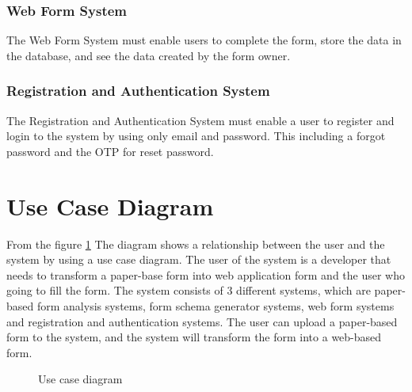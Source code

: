\documentclass[12pt,oneside,openright,a4paper]{cpe-english-project}
\begin{document}
\subsubsection{Web Form System}

The Web Form System must enable users to complete the form, store the data in the database, and see the data created by the form owner.

\subsubsection{Registration and Authentication System}

The Registration and Authentication System must enable a user to register and login to the system by using only email and password. This including a forgot password and the  OTP for reset password.	


\section{Use Case Diagram}

From the figure \ref{fig:use-case} The diagram shows a relationship between the user and the system by using a use case diagram. The user of the system is a developer that needs to transform a paper-base form into web application form and the user who going to fill the form. The system consists of 3 different systems, which are paper-based form analysis systems, form schema generator systems, web form systems and registration and authentication systems. The user can upload a paper-based form to the system, and the system will transform the form into a web-based form.

\begin{figure}[!h]
\centering
{}
\caption{Use case diagram}\label{fig:use-case}
\end{figure}
\end{document}
